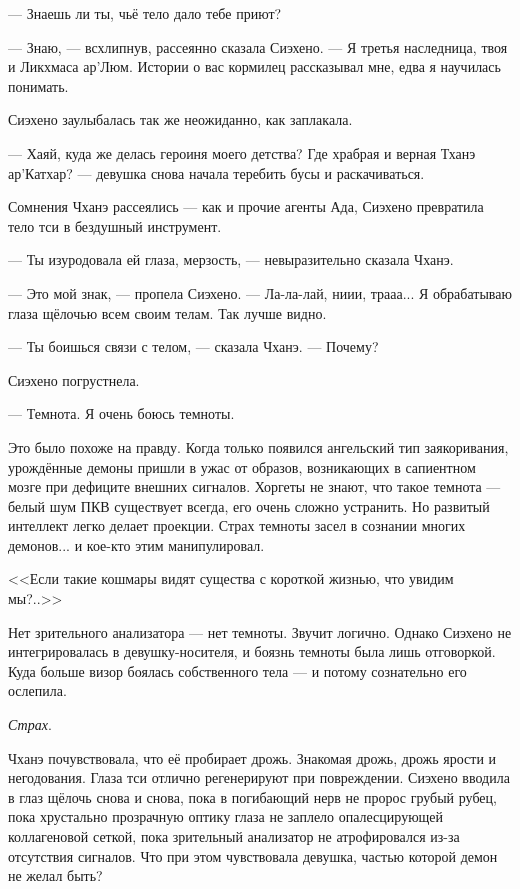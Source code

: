 --- Знаешь ли ты, чьё тело дало тебе приют?

--- Знаю, --- всхлипнув, рассеянно сказала Сиэхено.
--- Я третья наследница, твоя и Ликхмаса ар'Люм.
Истории о вас кормилец рассказывал мне, едва я научилась понимать.

Сиэхено заулыбалась так же неожиданно, как заплакала.

--- Хаяй, куда же делась героиня моего детства?
Где храбрая и верная Тханэ ар'Катхар? --- девушка снова начала теребить бусы и раскачиваться.

Сомнения Чханэ рассеялись --- как и прочие агенты Ада, Сиэхено превратила тело тси в бездушный инструмент.

--- Ты изуродовала ей глаза, мерзость, --- невыразительно сказала Чханэ.

--- Это мой знак, --- пропела Сиэхено.
--- Ла-ла-лай, ниии, трааа...
Я обрабатываю глаза щёлочью всем своим телам.
Так лучше видно.

--- Ты боишься связи с телом, --- сказала Чханэ.
--- Почему?

Сиэхено погрустнела.

--- Темнота.
Я очень боюсь темноты.

Это было похоже на правду.
Когда только появился ангельский тип заякоривания, урождённые демоны пришли в ужас от образов, возникающих в сапиентном мозге при дефиците внешних сигналов.
Хоргеты не знают, что такое темнота --- белый шум ПКВ существует всегда, его очень сложно устранить.
Но развитый интеллект легко делает проекции.
Страх темноты засел в сознании многих демонов... и кое-кто этим манипулировал.

<<Если такие кошмары видят существа с короткой жизнью, что увидим мы?..>>

Нет зрительного анализатора --- нет темноты.
Звучит логично.
Однако Сиэхено не интегрировалась в девушку-носителя, и боязнь темноты была лишь отговоркой.
Куда больше визор боялась собственного тела --- и потому сознательно его ослепила.

\emph{Страх}.

Чханэ почувствовала, что её пробирает дрожь.
Знакомая дрожь, дрожь ярости и негодования.
Глаза тси отлично регенерируют при повреждении.
Сиэхено вводила в глаз щёлочь снова и снова, пока в погибающий нерв не пророс грубый рубец, пока хрустально прозрачную оптику глаза не заплело опалесцирующей коллагеновой сеткой, пока зрительный анализатор не атрофировался из-за отсутствия сигналов.
Что при этом чувствовала девушка, частью которой демон не желал быть?

